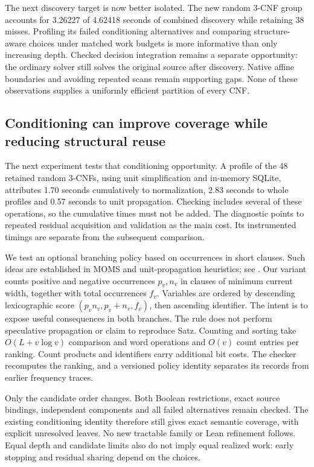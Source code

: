 \documentclass[11pt,a4paper]{article}
\numberwithin{equation}{section}
\theoremstyle{plain}
\theoremstyle{definition}
\theoremstyle{remark}
\begin{document}
The next discovery target is now better isolated. The new random 3-CNF group accounts for 3.26227 of 4.62418 seconds of combined discovery while retaining 38 misses. Profiling its failed conditioning alternatives and comparing structure-aware choices under matched work budgets is more informative than only increasing depth. Checked decision integration remains a separate opportunity: the ordinary solver still solves the original source after discovery. Native affine boundaries and avoiding repeated scans remain supporting gaps. None of these observations supplies a uniformly efficient partition of every CNF.

\subsection{Conditioning can improve coverage while reducing structural reuse}
\label{sec:conditioning-reuse-tradeoff}

The next experiment tests that conditioning opportunity. A profile of the 48 retained random 3-CNFs, using unit simplification and in-memory SQLite, attributes 1.70 seconds cumulatively to normalization, 2.83 seconds to whole profiles and 0.57 seconds to unit propagation. Checking includes several of these operations, so the cumulative times must not be added. The diagnostic points to repeated residual acquisition and validation as the main cost. Its instrumented timings are separate from the subsequent comparison.

We test an optional branching policy based on occurrences in short clauses. Such ideas are established in MOMS and unit-propagation heuristics; see \citet{li1997up}. Our variant counts positive and negative occurrences $p_v,n_v$ in clauses of minimum current width, together with total occurrences $f_v$. Variables are ordered by descending lexicographic score $(p_vn_v,p_v+n_v,f_v)$, then ascending identifier. The intent is to expose useful consequences in both branches. The rule does not perform speculative propagation or claim to reproduce Satz. Counting and sorting take $O(L+v\log v)$ comparison and word operations and $O(v)$ count entries per ranking. Count products and identifiers carry additional bit costs. The checker recomputes the ranking, and a versioned policy identity separates its records from earlier frequency traces.

Only the candidate order changes. Both Boolean restrictions, exact source bindings, independent components and all failed alternatives remain checked. The existing conditioning identity therefore still gives exact semantic coverage, with explicit unresolved leaves. No new tractable family or Lean refinement follows. Equal depth and candidate limits also do not imply equal realized work: early stopping and residual sharing depend on the choices.
\end{document}
